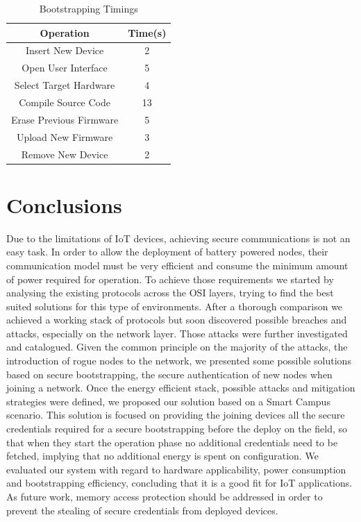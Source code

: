 \documentclass{sig-alternate-05-2015}
\begin{document}
\begin{table}
\centering
\caption{Bootstrapping Timings}
\label{tab:bootstrapping_time}
\begin{tabular}{|c|c|} \hline
Operation&Time(s)\\ \hline
Insert New Device&2\\ \hline
Open User Interface&5\\ \hline
Select Target Hardware&4\\ \hline
Compile Source Code&13\\ \hline
Erase Previous Firmware&5\\ \hline
Upload New Firmware&3\\ \hline
Remove New Device&2\\ 
\hline\end{tabular}
\end{table}

\section{Conclusions}
\label{sec:conclusion}
Due to the limitations of \gls{IoT} devices, achieving secure communications is not an easy task. In order to allow the deployment of battery powered nodes, their communication model must be very efficient and consume the minimum amount of power required for operation. To achieve those requirements we started by analysing the existing protocols across the OSI layers, trying to find the best suited solutions for this type of environments. After a thorough comparison we achieved a working stack of protocols but soon discovered possible breaches and attacks, especially on the network layer. Those attacks were further investigated and catalogued. Given the common principle on the majority of the attacks, the introduction of rogue nodes to the network, we presented some possible solutions based on secure bootstrapping, the secure authentication of new nodes when joining a network.
Once the energy efficient stack, possible attacks and mitigation strategies were defined, we proposed our solution based on a Smart Campus scenario. This solution is focused on providing the joining devices all the secure credentials required for a secure bootstrapping before the deploy on the field, so that when they start the operation phase no additional credentials need to be fetched, implying that no additional energy is spent on configuration.
We evaluated our system with regard to hardware applicability, power consumption and bootstrapping efficiency, concluding that it is a good fit for \gls{IoT} applications.
As future work, memory access protection should be addressed in order to prevent the stealing of secure credentials from deployed devices.
\end{document}
